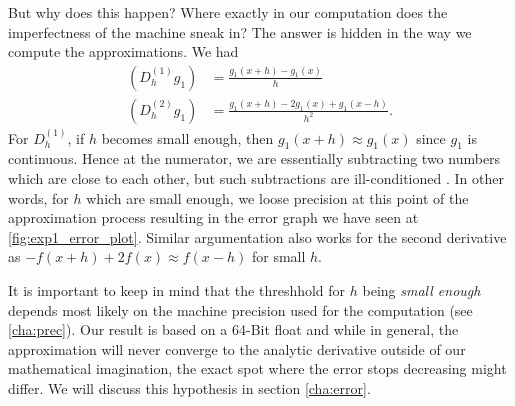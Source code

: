 But why does this happen? Where exactly in our computation does the imperfectness of the machine sneak in? The answer is hidden in the way we compute the approximations. We had
\begin{align*}
    (D^{(1)}_h g_1) &= \frac{g_1(x + h) - g_1(x)}{h} \\
    (D^{(2)}_h g_1) &= \frac{g_1(x + h) - 2 g_1(x) + g_1(x - h)}{h^2} \text{.}
\end{align*}
For \(D^{(1)}_h\), if \(h\) becomes small enough, then \(g_1(x + h) \approx g_1(x)\) since \(g_1\) is continuous. Hence at the numerator, we are essentially subtracting two numbers which are close to each other, but such subtractions are ill-conditioned \cite{Lecture}. In other words, for \(h\) which are small enough, we loose precision at this point of the approximation process resulting in the error graph we have seen at \ref{fig:exp1_error_plot}. Similar argumentation also works for the second derivative as \(- f(x + h) + 2 f(x) \approx f(x - h)\) for small \(h\).

It is important to keep in mind that the threshhold for \(h\) being \textit{small enough} depends most likely on the machine precision used for the computation (see \ref{cha:prec}). Our result is based on a 64-Bit float and while in general, the approximation will never converge to the analytic derivative outside of our mathematical imagination, the exact spot where the error stops decreasing might differ. We will discuss this hypothesis in section \ref{cha:error}.
